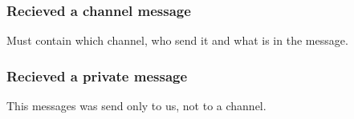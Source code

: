 \documentclass[12pt,a4paper]{article}
\begin{document}
\subsubsection{Recieved a channel message}
Must contain which channel, who send it and what is in the message.
\subsubsection{Recieved a private message}
This messages was send only to us, not to a channel.
\end{document}
